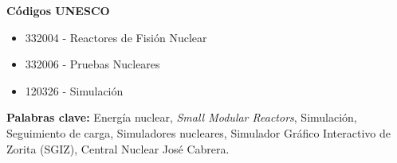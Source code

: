 \documentclass[a4paper, 11pt, spanish, twoside]{article}
\begin{document}
\newpage
\textbf{Códigos UNESCO}
    \begin{itemize}
        \item 332004 - Reactores de Fisión Nuclear
        \item 332006 - Pruebas Nucleares
        \item 120326 - Simulación
    \end{itemize}

 \textbf{Palabras clave:} Energía nuclear, \textit{Small Modular Reactors}, Simulación, Seguimiento de carga, Simuladores nucleares, Simulador Gráfico Interactivo de Zorita (SGIZ), Central Nuclear José Cabrera.



\afterpage{\blankpage} %


\newpage
\renewcommand*\contentsname{ÍNDICE} %
\tableofcontents %
\afterpage{\blankpage} %

\newpage
{}




\newpage
\renewcommand{\listtablename}{ÍNDICE DE TABLAS} %
\listoftables %
\end{document}
